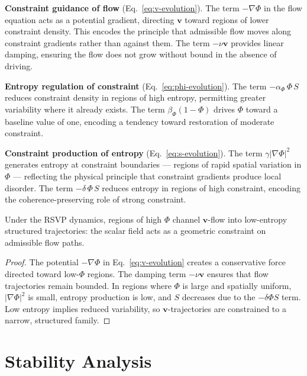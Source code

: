\documentclass[11pt,openany]{book}
\begin{document}
\textbf{Constraint guidance of flow} (Eq.~\eqref{eq:v-evolution}).
The term $-\nabla\Phi$ in the flow equation acts as a
potential gradient, directing $\boldsymbol{v}$ toward
regions of lower constraint density.  This encodes the
principle that admissible flow moves along constraint
gradients rather than against them.  The term $-\nu
\boldsymbol{v}$ provides linear damping, ensuring the flow
does not grow without bound in the absence of driving.

\textbf{Entropy regulation of constraint}
(Eq.~\eqref{eq:phi-evolution}).
The term $-\alpha_\Phi\, \Phi\, S$ reduces constraint
density in regions of high entropy, permitting greater
variability where it already exists.  The term
$\beta_\Phi (1 - \Phi)$ drives $\Phi$ toward a baseline
value of one, encoding a tendency toward restoration of
moderate constraint.

\textbf{Constraint production of entropy}
(Eq.~\eqref{eq:s-evolution}).
The term $\gamma |\nabla\Phi|^2$ generates entropy at
constraint boundaries — regions of rapid spatial variation
in $\Phi$ — reflecting the physical principle that
constraint gradients produce local disorder.  The term
$-\delta\, \Phi\, S$ reduces entropy in regions of high
constraint, encoding the coherence-preserving role of
strong constraint.

\begin{proposition}
\label{prop:constraint-flow}
Under the RSVP dynamics, regions of high $\Phi$ channel
$\boldsymbol{v}$-flow into low-entropy structured
trajectories: the scalar field acts as a geometric
constraint on admissible flow paths.
\end{proposition}

\begin{proof}
The potential $-\nabla\Phi$ in Eq.~\eqref{eq:v-evolution}
creates a conservative force directed toward low-$\Phi$
regions.  The damping term $-\nu\boldsymbol{v}$ ensures
that flow trajectories remain bounded.  In regions where
$\Phi$ is large and spatially uniform, $|\nabla\Phi|^2$
is small, entropy production is low, and $S$ decreases
due to the $-\delta\Phi S$ term.  Low entropy implies
reduced variability, so $\boldsymbol{v}$-trajectories are
constrained to a narrow, structured family.
\end{proof}

\section{Stability Analysis}
\label{sec:rsvp-stability}
\end{document}
